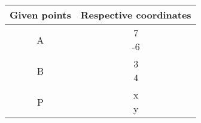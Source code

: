 \begin{tabular}[12pt]{ |c| c|}
    \hline
    \textbf{Given points} & \textbf{Respective coordinates}\\ 
    \hline
	A & \myvec{7 \\ -6}\\
    \hline 
	B & \myvec{3 \\ 4}\\
    \hline
	P & \myvec{x \\ y}\\
    \hline   
    \end{tabular}
